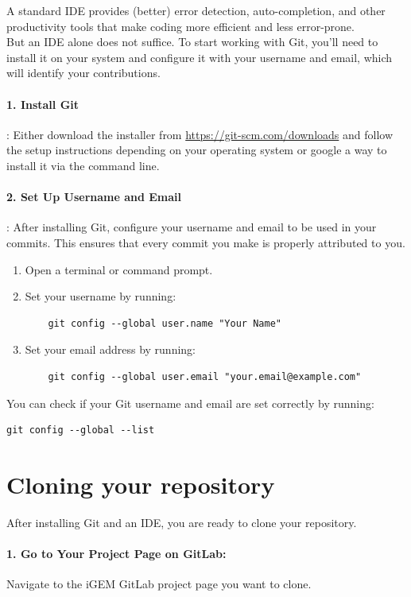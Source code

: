 A standard IDE provides (better) error detection, auto-completion, and other productivity tools that make coding more efficient and less error-prone. \\ \newline
But an IDE alone does not suffice.
To start working with Git, you'll need to install it on your system and configure it with your username and email, which will identify your contributions.

\paragraph{1. Install Git}: Either download the installer from
\href{https://git-scm.com}{https://git-scm.com/downloads} and follow the setup instructions depending on your operating system or google a way to install it via the command line.

\paragraph{2. Set Up Username and Email}: After installing Git, configure your username and email to be used in your
commits.
This ensures that every commit you make is properly attributed to you.
\begin{enumerate}
    \item Open a terminal or command prompt.
    \item Set your username by running:
    \begin{verbatim}
    git config --global user.name "Your Name"
    \end{verbatim}
    \item Set your email address by running:
    \begin{verbatim}
    git config --global user.email "your.email@example.com"
    \end{verbatim}
\end{enumerate}
You can check if your Git username and email are set correctly by running:
\begin{verbatim}
git config --global --list
\end{verbatim}

\section{Cloning your repository}\label{sec:cloning} 
After installing Git and an IDE, you are ready to clone your repository.
\paragraph{1. Go to Your Project Page on GitLab:}
Navigate to the iGEM GitLab project page you want to clone.  
